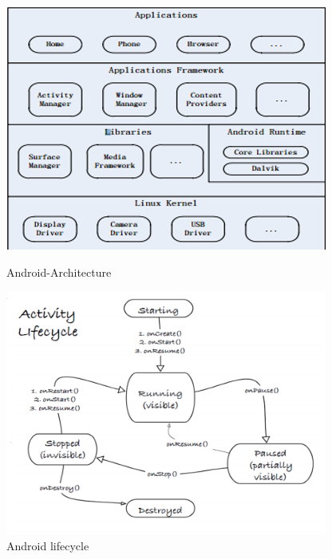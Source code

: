 \begin{figure}[p]
	\begin{minipage}[b]{0.47\textwidth}
		\includegraphics{img/Android-Architecture.png}
		\caption{Android-Architecture ~\cite{androidarch}}
	\end{minipage}
	
	\begin{minipage}[b]{0.47\textwidth}
		\includegraphics{img/activity-lifecycle.png}
		\caption{Android lifecycle}
	\end{minipage}
\end{figure}

